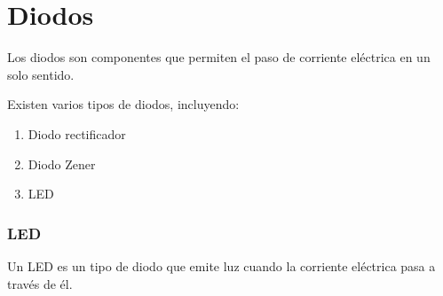 \documentclass[../principal.tex]{subfiles}
\begin{document}
\chapter{Diodos}

Los diodos son componentes que permiten el paso de corriente eléctrica en un solo sentido.

Existen varios tipos de diodos, incluyendo:

\begin{enumerate}
    \item Diodo rectificador
    \item Diodo Zener
    \item LED
\end{enumerate}

\subsection{LED}

Un LED es un tipo de diodo que emite luz cuando la corriente eléctrica pasa a través de él.

\newpage
\end{document}
